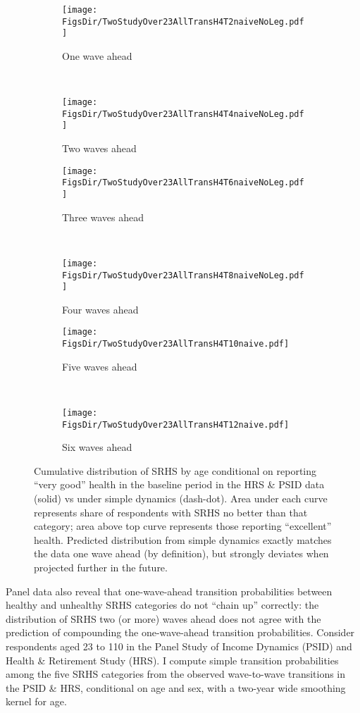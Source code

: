 \documentclass[12pt,pdftex,letterpaper]{article}
\newcommand{\RootDir}{..}
\newcommand{\FigsDir}{\RootDir/Figures}
\begin{document}
\begin{figure}[h!]
	\centering
	\begin{subfigure}[b]{0.48\textwidth}
		\texttt{[image: \\FigsDir/TwoStudyOver23AllTransH4T2naiveNoLeg.pdf]}
		\caption{One wave ahead}\label{fig:Naive1AheadVeryGood}
	\end{subfigure}
	~
	\begin{subfigure}[b]{0.48\textwidth}
		\texttt{[image: \\FigsDir/TwoStudyOver23AllTransH4T4naiveNoLeg.pdf]}
		\caption{Two waves ahead}\label{fig:Naive2AheadVeryGood}
	\end{subfigure}
	
	\begin{subfigure}[b]{0.48\textwidth}
		\texttt{[image: \\FigsDir/TwoStudyOver23AllTransH4T6naiveNoLeg.pdf]}
		\caption{Three waves ahead}\label{fig:Naive3AheadVeryGood}
	\end{subfigure}
	~
	\begin{subfigure}[b]{0.48\textwidth}
		\texttt{[image: \\FigsDir/TwoStudyOver23AllTransH4T8naiveNoLeg.pdf]}
		\caption{Four waves ahead}\label{fig:Naive4AheadVeryGood}
	\end{subfigure}
	
	\begin{subfigure}[b]{0.48\textwidth}
		\texttt{[image: \\FigsDir/TwoStudyOver23AllTransH4T10naive.pdf]}
		\caption{Five waves ahead}\label{fig:Naive5AheadVeryGood}
	\end{subfigure}
	~
	\begin{subfigure}[b]{0.48\textwidth}
		\texttt{[image: \\FigsDir/TwoStudyOver23AllTransH4T12naive.pdf]}
		\caption{Six waves ahead}\label{fig:Naive6AheadVeryGood}
	\end{subfigure}
	\caption{Cumulative distribution of SRHS by age conditional on reporting ``very good'' health in the baseline period in the HRS \& PSID data (solid) vs under simple dynamics (dash-dot).  Area under each curve represents share of respondents with SRHS no better than that category; area above top curve represents those reporting ``excellent'' health. Predicted distribution from simple dynamics exactly matches the data one wave ahead (by definition), but strongly deviates when projected further in the future.}\label{fig:NaiveTransVG}
\end{figure}

Panel data also reveal that one-wave-ahead transition probabilities between healthy and unhealthy SRHS categories do not ``chain up'' correctly: the distribution of SRHS two (or more) waves ahead does not agree with the prediction of compounding the one-wave-ahead transition probabilities. Consider respondents aged 23 to 110 in the Panel Study of Income Dynamics (PSID) and Health \& Retirement Study (HRS). I compute simple transition probabilities among the five SRHS categories from the observed wave-to-wave transitions in the PSID \& HRS, conditional on age and sex, with a two-year wide smoothing kernel for age.
\end{document}
